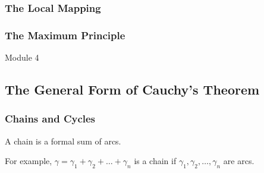 \subsubsection{The Local Mapping}

\subsubsection{The Maximum Principle}
{\Large Module 4 }
\subsection{The General Form of Cauchy's Theorem}
\subsubsection{Chains and Cycles}
\begin{definition}[chain]
	A chain is a formal sum of arcs.
\end{definition}
For example, $\gamma = \gamma_1 + \gamma_2 + \dots + \gamma_n$ is a chain if $\gamma_1,\gamma_2,\dots,\gamma_n$ are arcs.
